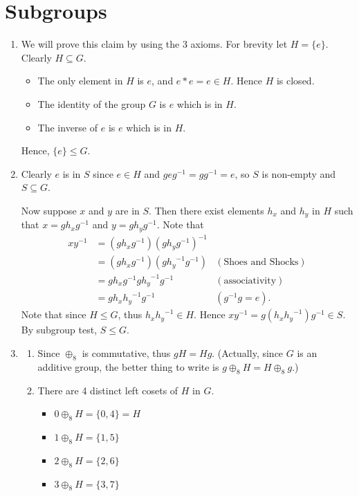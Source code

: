 \section{Subgroups}
\begin{enumerate}
    \item We will prove this claim by using the 3 axioms. For brevity let $H = \{e\}$. Clearly $H \subseteq G$.
    \begin{itemize}
        \item The only element in $H$ is $e$, and $e \ast e = e \in H$. Hence $H$ is closed.
        \item The identity of the group $G$ is $e$ which is in $H$.
        \item The inverse of $e$ is $e$ which is in $H$.
    \end{itemize}
    Hence, $\{e\} \leq G$.

    \item Clearly $e$ is in $S$ since $e \in H$ and $geg^{-1} = gg^{-1} = e$, so $S$ is non-empty and $S \subseteq G$.

    Now suppose $x$ and $y$ are in $S$. Then there exist elements $h_x$ and $h_y$ in $H$ such that $x = gh_xg^{-1}$ and $y = gh_yg^{-1}$. Note that
    \begin{align*}
        xy^{-1} &= (gh_xg^{-1})(gh_yg^{-1})^{-1}\\
        &= (gh_xg^{-1})(g{h_y}^{-1}g^{-1}) & (\text{Shoes and Shocks})\\
        &= gh_xg^{-1}g{h_y}^{-1}g^{-1} & (\text{associativity})\\
        &= gh_x{h_y}^{-1}g^{-1} & (g^{-1}g = e).
    \end{align*}
    Note that since $H \leq G$, thus $h_x{h_y}^{-1} \in H$. Hence $xy^{-1} = g(h_x{h_y}^{-1})g^{-1} \in S$. By subgroup test, $S \leq G$.

    \item \begin{enumerate}[label=(\alph*)]
        \item Since $\oplus_8$ is commutative, thus $gH = Hg$.\newline
        (Actually, since $G$ is an additive group, the better thing to write is $g \oplus_8 H = H \oplus_8 g$.)
        \item There are 4 distinct left cosets of $H$ in $G$.
        \begin{itemize}
            \item $0 \oplus_8 H = \{0, 4\} = H$
            \item $1 \oplus_8 H = \{1, 5\}$
            \item $2 \oplus_8 H = \{2, 6\}$
            \item $3 \oplus_8 H = \{3, 7\}$
        \end{itemize}
    \end{enumerate}


\end{enumerate}
